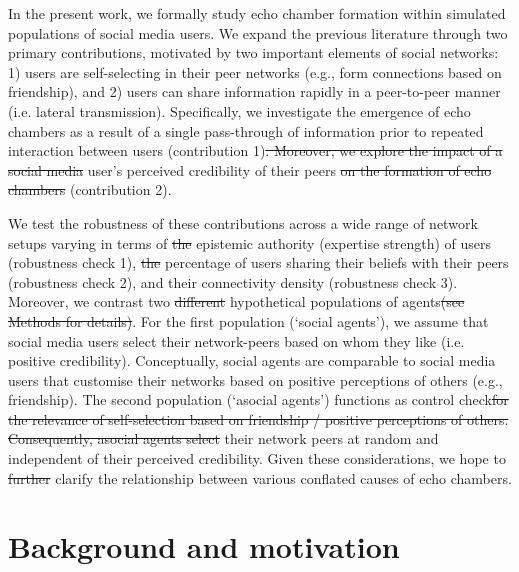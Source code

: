 \documentclass[fleqn,10pt]{wlscirep}
\providecommand{\DIFadd}[1]{{\protect\color{blue}\uwave{#1}}} %
\providecommand{\DIFdel}[1]{{\protect\color{red}\sout{#1}}}                      %
\providecommand{\DIFaddbegin}{} %
\providecommand{\DIFaddend}{} %
\providecommand{\DIFdelbegin}{} %
\providecommand{\DIFdelend}{} %
\begin{document}
In the present work, we formally study echo chamber formation within simulated populations of social media users. We expand the previous literature through two primary contributions, motivated by two important elements of social networks: 1) users are self-selecting in their peer networks (e.g., form connections based on friendship), and 2) users can share information rapidly in a peer-to-peer manner (i.e. lateral transmission). Specifically, we investigate the emergence of echo chambers as a result of a single pass-through of information prior to repeated interaction between users (contribution 1)\DIFdelbegin \DIFdel{. Moreover, we explore the impact of a social media }\DIFdelend \DIFaddbegin \DIFadd{, and how this is impacted by a }\DIFaddend user's perceived credibility of their peers \DIFdelbegin \DIFdel{on the formation of echo chambers }\DIFdelend (contribution 2). 

We test the robustness of these contributions across a wide range of network setups varying in terms of \DIFdelbegin \DIFdel{the }\DIFdelend epistemic authority (expertise strength) of users (robustness check 1), \DIFdelbegin \DIFdel{the }\DIFdelend percentage of users sharing their beliefs with their peers (robustness check 2), and their connectivity density (robustness check 3). Moreover, we contrast two \DIFdelbegin \DIFdel{different }\DIFdelend hypothetical populations of agents\DIFdelbegin \DIFdel{(see Methods for details)}\DIFdelend . For the first population (`social agents'), we assume that social media users select their network-peers based on whom they like (i.e. positive credibility). Conceptually, social agents are comparable to social media users that customise their networks based on positive perceptions of others (e.g., friendship). The second population (`asocial agents') functions as control check\DIFdelbegin \DIFdel{for the relevance of self-selection based on friendship / positive perceptions of others. Consequently, asocial agents select }\DIFdelend \DIFaddbegin \DIFadd{, selecting }\DIFaddend their network peers at random and independent of their perceived credibility. Given these considerations, we hope to \DIFdelbegin \DIFdel{further }\DIFdelend clarify the relationship between various conflated causes of echo chambers. 


\section*{Background and motivation}
\end{document}
